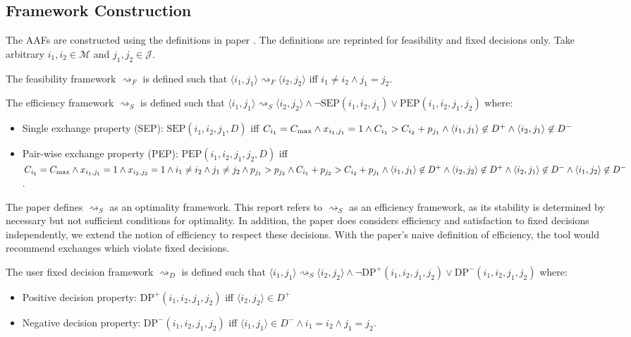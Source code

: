 \subsection{Framework Construction}

The AAFs are constructed using the definitions in paper \cite{aes}. The definitions are reprinted for feasibility and fixed decisions only. Take arbitrary $i_1,i_2\in\mathcal{M}$ and $j_1,j_2\in\mathcal{J}$.

\begin{definition}
	The feasibility framework $\rightsquigarrow_F$ is defined such that $\langle i_1,j_1\rangle\rightsquigarrow_F\langle i_2,j_2\rangle$ iff $i_1\neq i_2\land j_1=j_2$.
\end{definition}

\begin{definition}
	The efficiency framework $\rightsquigarrow_S$ is defined such that $\langle i_1,j_1\rangle\rightsquigarrow_S\langle i_2,j_2\rangle\land\neg\text{SEP}(i_1,i_2,j_1)\lor\text{PEP}(i_1,i_2,j_1,j_2)$ where:
	\begin{itemize}
		\item Single exchange property (SEP): $\text{SEP}(i_1,i_2,j_1, D)$ iff $C_{i_1}=C_{\max}\land x_{i_1,j_1}=1\land C_{i_1}>C_{i_2}+p_{j_1}\land\langle{i_1},{j_1}\rangle\not\in D^+\land\langle{i_2},{j_1}\rangle\not\in D^-$
		\item Pair-wise exchange property (PEP): $\text{PEP}(i_1,i_2,j_1,j_2, D)$ iff $C_{i_1}=C_{\max}\land x_{i_1,j_1}=1\land x_{i_2,j_2}=1\land i_1\neq i_2\land j_1\neq j_2\land p_{j_1}>p_{j_2}\land C_{i_1}+p_{j_2}>C_{i_2}+p_{j_1}\land\langle{i_1},{j_1}\rangle\not\in D^+\land\langle{i_2},{j_2}\rangle\not\in D^+\land\langle{i_2},{j_1}\rangle\not\in D^-\land\langle{i_1},{j_2}\rangle\not\in D^-$.
	\end{itemize}

The paper \cite{aes} defines $\rightsquigarrow_S$ as an optimality framework. This report refers to $\rightsquigarrow_S$ as an efficiency framework, as its stability is determined by necessary but not sufficient conditions for optimality. In addition, the paper does considers efficiency and satisfaction to fixed decisions independently, we extend the notion of efficiency to respect these decisions. With the paper's naive definition of efficiency, the tool would recommend exchanges which violate fixed decisions.

\end{definition}

\begin{definition}
	The user fixed decision framework $\rightsquigarrow_D$ is defined such that $\langle i_1,j_1\rangle\rightsquigarrow_S\langle i_2,j_2\rangle\land\neg\text{DP}^+(i_1,i_2,j_1,j_2)\lor\text{DP}^-(i_1,i_2,j_1,j_2)$ where:
	\begin{itemize}
		\item Positive decision property: $\text{DP}^+(i_1,i_2,j_1,j_2)$ iff $\langle i_2, j_2\rangle\in D^+$
		\item Negative decision property: $\text{DP}^-(i_1,i_2,j_1,j_2)$ iff $\langle i_1, j_1\rangle\in D^-\land i_1=i_2\land j_1=j_2$.
	\end{itemize}
\end{definition}

